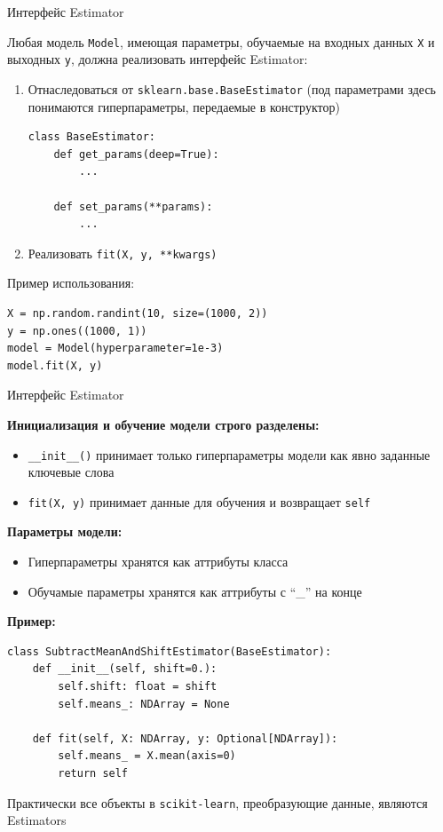 \documentclass{beamer}
\begin{document}
\begin{frame}[fragile]{Интерфейс Estimator}
    \footnotesize

    Любая модель \texttt{Model}, имеющая параметры, обучаемые на входных данных \texttt{X} и выходных \texttt{y}, должна реализовать интерфейс Estimator:
    \begin{enumerate}
        \item Отнаследоваться от \texttt{sklearn.base.BaseEstimator} (под параметрами здесь понимаются гиперпараметры, передаемые в конструктор)
        \begin{lstlisting}
class BaseEstimator:
    def get_params(deep=True):
        ...

    def set_params(**params):
        ...\end{lstlisting}    
        \item Реализовать \texttt{fit(X, y, **kwargs)}
    \end{enumerate}

    Пример использования:
    \begin{lstlisting}
X = np.random.randint(10, size=(1000, 2))
y = np.ones((1000, 1))
model = Model(hyperparameter=1e-3)
model.fit(X, y)\end{lstlisting}
        
\end{frame}

\begin{frame}[fragile]{Интерфейс Estimator}
    \footnotesize
    
    \textbf{Инициализация и обучение модели строго разделены:}
    \begin{itemize}
        \item \texttt{\_\_init\_\_()} принимает только гиперпараметры модели как явно заданные ключевые слова
        \item \texttt{fit(X, y)} принимает данные для обучения и возвращает \texttt{self}
    \end{itemize}

    \textbf{Параметры модели:}
    \begin{itemize}
        \item Гиперпараметры хранятся как аттрибуты класса
        \item Обучамые параметры хранятся как аттрибуты с ``\_'' на конце
    \end{itemize}

    \textbf{Пример:}
    \begin{lstlisting}
class SubtractMeanAndShiftEstimator(BaseEstimator):
    def __init__(self, shift=0.):
        self.shift: float = shift
        self.means_: NDArray = None

    def fit(self, X: NDArray, y: Optional[NDArray]):
        self.means_ = X.mean(axis=0)
        return self\end{lstlisting}

    Практически все объекты в \texttt{scikit-learn}, преобразующие данные, являются Estimators
\end{frame}
\end{document}
